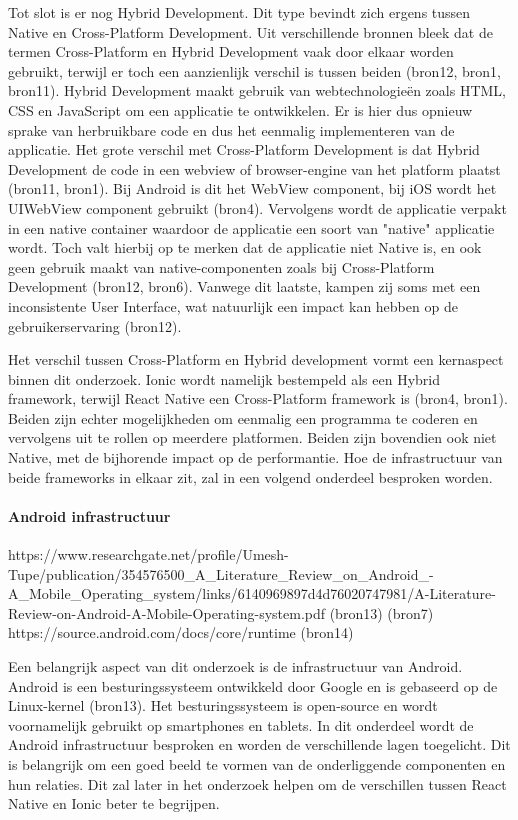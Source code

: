 Tot slot is er nog Hybrid Development. Dit type bevindt zich ergens tussen Native en Cross-Platform Development. Uit verschillende bronnen bleek dat de termen Cross-Platform en Hybrid Development vaak door elkaar worden gebruikt, terwijl er toch een aanzienlijk verschil is tussen beiden (bron12, bron1, bron11). Hybrid Development maakt gebruik van webtechnologieën zoals HTML, CSS en JavaScript om een applicatie te ontwikkelen. Er is hier dus opnieuw sprake van herbruikbare code en dus het eenmalig implementeren van de applicatie. Het grote verschil met Cross-Platform Development is dat Hybrid Development de code in een webview of browser-engine van het platform plaatst (bron11, bron1). Bij Android is dit het WebView component, bij iOS wordt het UIWebView component gebruikt (bron4). Vervolgens wordt de applicatie verpakt in een native container waardoor de applicatie een soort van "native" applicatie wordt. Toch valt hierbij op te merken dat de applicatie niet Native is, en ook geen gebruik maakt van native-componenten zoals bij Cross-Platform Development (bron12, bron6). Vanwege dit laatste, kampen zij soms met een inconsistente User Interface, wat natuurlijk een impact kan hebben op de gebruikerservaring (bron12).

Het verschil tussen Cross-Platform en Hybrid development vormt een kernaspect binnen dit onderzoek. Ionic wordt namelijk bestempeld als een Hybrid framework, terwijl React Native een Cross-Platform framework is (bron4, bron1). Beiden zijn echter mogelijkheden om eenmalig een programma te coderen en vervolgens uit te rollen op meerdere platformen. Beiden zijn bovendien ook niet Native, met de bijhorende impact op de performantie. Hoe de infrastructuur van beide frameworks in elkaar zit, zal in een volgend onderdeel besproken worden.


\paragraph{Android infrastructuur}

https://www.researchgate.net/profile/Umesh-Tupe/publication/354576500_A_Literature_Review_on_Android_-A_Mobile_Operating_system/links/6140969897d4d76020747981/A-Literature-Review-on-Android-A-Mobile-Operating-system.pdf (bron13)
(bron7)
https://source.android.com/docs/core/runtime (bron14)

Een belangrijk aspect van dit onderzoek is de infrastructuur van Android. Android is een besturingssysteem ontwikkeld door Google en is gebaseerd op de Linux-kernel (bron13). Het besturingssysteem is open-source en wordt voornamelijk gebruikt op smartphones en tablets. In dit onderdeel wordt de Android infrastructuur besproken en worden de verschillende lagen toegelicht. Dit is belangrijk om een goed beeld te vormen van de onderliggende componenten en hun relaties. Dit zal later in het onderzoek helpen om de verschillen tussen React Native en Ionic beter te begrijpen.

